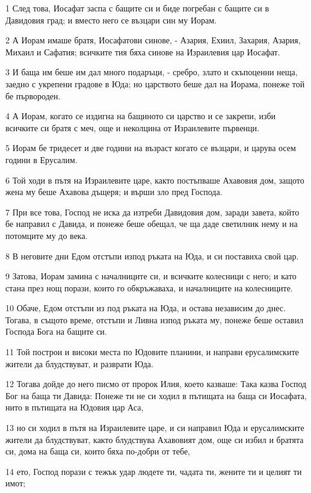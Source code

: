 \par 1 След това, Иосафат заспа с бащите си и биде погребан с бащите си в Давидовия град; и вместо него се възцари син му Иорам.
\par 2 А Иорам имаше братя, Иосафатови синове, - Азария, Ехиил, Захария, Азария, Михаил и Сафатия; всичките тия бяха синове на Израилевия цар Иосафат.
\par 3 И баща им беше им дал много подаръци, - сребро, злато и скъпоценни неща, заедно с укрепени градове в Юда; но царството беше дал на Иорама, понеже той бе първороден.
\par 4 А Иорам, когато се издигна на бащиното си царство и се закрепи, изби всичките си братя с меч, още и неколцина от Израилевите първенци.
\par 5 Иорам бе тридесет и две години на възраст когато се възцари, и царува осем години в Ерусалим.
\par 6 Той ходи в пътя на Израилевите царе, както постъпваше Ахавовия дом, защото жена му беше Ахавова дъщеря; и върши зло пред Господа.
\par 7 При все това, Господ не иска да изтреби Давидовия дом, заради завета, който бе направил с Давида, и понеже беше обещал, че ща даде светилник нему и на потомците му до века.
\par 8 В неговите дни Едом отстъпи изпод ръката на Юда, и си поставиха свой цар.
\par 9 Затова, Иорам замина с началниците си, и всичките колесници с него; и като стана през нощ порази, които го обкръжаваха, и началниците на колесниците.
\par 10 Обаче, Едом отстъпи из под ръката на Юда, и остава независим до днес. Тогава, в същото време, отстъпи и Ливна изпод ръката му, понеже беше оставил Господа Бога на бащите си.
\par 11 Той построи и високи места по Юдовите планини, и направи ерусалимските жители да блудствуват, и разврати Юда.
\par 12 Тогава дойде до него писмо от пророк Илия, което казваше: Така казва Господ Бог на баща ти Давида: Понеже ти не си ходил в пътищата на баща си Иосафата, нито в пътищата на Юдовия цар Аса,
\par 13 но си ходил в пътя на Израилевите царе, и си направил Юда и ерусалимските жители да блудствуват, както блудствува Ахавовият дом, още си избил и братята си, дома на баща си, които бяха по-добри от тебе,
\par 14 ето, Господ порази с тежък удар людете ти, чадата ти, жените ти и целият ти имот;
